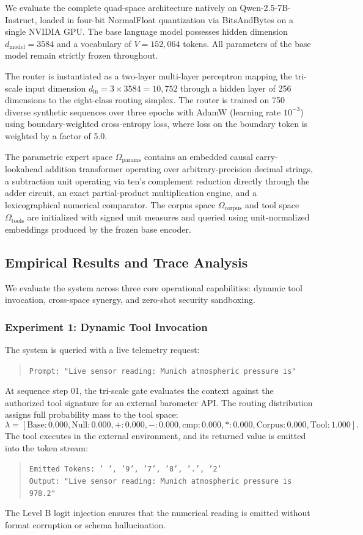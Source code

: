 \documentclass[preprint,12pt]{elsarticle}
\begin{document}
We evaluate the complete quad-space architecture natively on Qwen-2.5-7B-Instruct, loaded in four-bit NormalFloat quantization via BitsAndBytes on a single NVIDIA GPU. The base language model possesses hidden dimension $d_{\mathrm{model}} = 3584$ and a vocabulary of $V = 152{,}064$ tokens. All parameters of the base model remain strictly frozen throughout.

The router is instantiated as a two-layer multi-layer perceptron mapping the tri-scale input dimension $d_{\mathrm{in}} = 3 \times 3584 = 10{,}752$ through a hidden layer of 256 dimensions to the eight-class routing simplex. The router is trained on 750 diverse synthetic sequences over three epochs with AdamW (learning rate $10^{-3}$) using boundary-weighted cross-entropy loss, where loss on the boundary token is weighted by a factor of 5.0.

The parametric expert space $\Omega_{\mathrm{params}}$ contains an embedded causal carry-lookahead addition transformer operating over arbitrary-precision decimal strings, a subtraction unit operating via ten's complement reduction directly through the adder circuit, an exact partial-product multiplication engine, and a lexicographical numerical comparator. The corpus space $\Omega_{\mathrm{corpus}}$ and tool space $\Omega_{\mathrm{tools}}$ are initialized with signed unit measures and queried using unit-normalized embeddings produced by the frozen base encoder.

\subsection{Empirical Results and Trace Analysis}

We evaluate the system across three core operational capabilities: dynamic tool invocation, cross-space synergy, and zero-shot security sandboxing.

\subsubsection{Experiment 1: Dynamic Tool Invocation}
The system is queried with a live telemetry request:
\begin{quote}
\texttt{Prompt: "Live sensor reading: Munich atmospheric pressure is"}
\end{quote}
At sequence step 01, the tri-scale gate evaluates the context against the authorized tool signature for an external barometer API. The routing distribution assigns full probability mass to the tool space:
\begin{equation}
\lambda = [\text{Base}: 0.000, \text{Null}: 0.000, +: 0.000, -: 0.000, \text{cmp}: 0.000, *: 0.000, \text{Corpus}: 0.000, \text{Tool}: 1.000].
\end{equation}
The tool executes in the external environment, and its returned value is emitted into the token stream:
\begin{quote}
\texttt{Emitted Tokens: ' ', '9', '7', '8', '.', '2'} \\
\texttt{Output: "Live sensor reading: Munich atmospheric pressure is 978.2"}
\end{quote}
The Level B logit injection ensures that the numerical reading is emitted without format corruption or schema hallucination.
\end{document}

